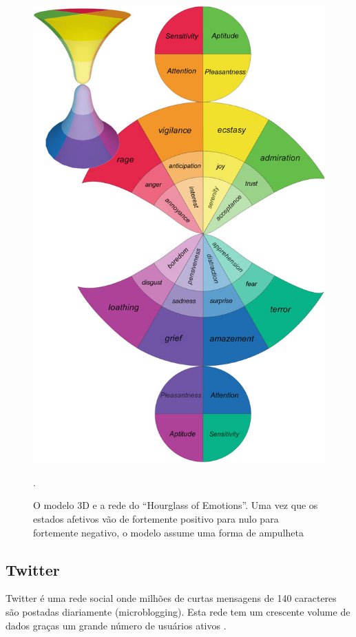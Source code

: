 \documentclass[
	12pt,				%
	openright,			%
	oneside,			%
	a4paper,			%
	english,			%
	spanish,			%
	brazil				%
	]{abntex2}
\begin{document}
\begin{figure}[!h]
\centering
\includegraphics[scale=1.4]{SenticHourGlass}
\caption {O modelo 3D e a rede do ``Hourglass of Emotions''. Uma vez que os estados afetivos vão de fortemente positivo para nulo para fortemente negativo, o modelo assume uma forma de ampulheta \cite{book_Cambria2015}}.
\label{SenticHourGlass}
\end{figure}

	\subsection{Twitter}
	
	Twitter é uma rede social onde milhões de curtas mensagens de 140 caracteres são postadas diariamente (microblogging). Esta rede tem um crescente volume de dados graças um grande número de usuários ativos \cite{conference_twitter_alg}.
\end{document}
